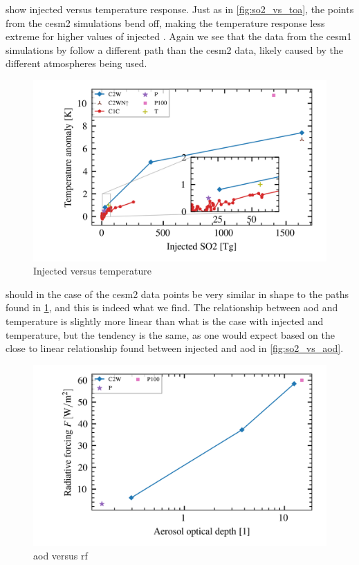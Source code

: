 \documentclass[twocol]{ametsocV5}
\newcommand{\iso}[1][i]{{#1}njected \ce{SO2}}
\begin{document}
 show \iso{} versus temperature response. Just as in
\cref{fig:so2_vs_toa}, the points from the \acrshort{cesm2} simulations bend off, making
the temperature response less extreme for higher values of \iso. Again we see that the
data from the \acrshort{cesm1} simulations by \citet{ottobliesner2016} follow a
different path than the \acrshort{cesm2} data, likely caused by the different
atmospheres being used.

\begin{figure}
  \begin{center}
    \includegraphics[width=0.95\linewidth]{figures/injection_vs_temperature.png}
  \end{center}
  \caption{Injected  versus temperature}%
  \label{fig:so2_vs_temp}
\end{figure}

 should in the case of the \acrshort{cesm2} data points be very
similar in shape to the paths found in \cref{fig:so2_vs_temp}, and this is indeed what
we find. The relationship between \acrshort{aod} and temperature is slightly more linear
than what is the case with \iso{} and temperature, but the tendency is the same, as one
would expect based on the close to linear relationship found between \iso{} and
\acrshort{aod} in \cref{fig:so2_vs_aod}.

\begin{figure}
  \centering
  \includegraphics[width=0.95\linewidth]{figures/aod_vs_toa_logscale.png}
  \caption{\acrshort{aod} versus \acrshort{rf}}%
  \label{fig:aod_vs_toa_logscale}
\end{figure}
\end{document}
